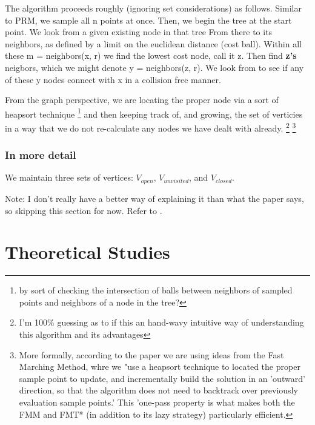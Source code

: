 \documentclass[a4paper]{article}
\begin{document}
The algorithm proceeds roughly (ignoring set considerations) as follows. 
Similar to PRM, we sample all n points at once. Then, we begin the tree at the start
point. We look from a given existing node in that tree From there to its
neighbors, as defined by a limit on the euclidean distance (cost ball). Within
all these m = neighbors(x, r) we find the lowest cost node, call it z. Then find \textbf{z's}
neigbors, which we might denote y = neighbors(z, r). We look from to see if any
of these y nodes connect with x in a collision free manner.

From the graph perspective, we are locating the proper node via a sort of
heapsort technique \footnote{by sort of checking the intersection of balls
between neighbors of sampled points and neighbors of a node in the tree?} and
then keeping track of, and growing, the set of verticies in a way that we do not
re-calculate any nodes we have dealt with already. \footnote{I'm 100\% guessing
as to if this an hand-wavy intuitive way of understanding this algorithm and its
advantages} \footnote{More formally, according to the paper \cite{FMT*} we are using ideas
from the Fast Marching Method, whre we "use a heapsort technique to located the
proper sample point to update, and incrementally build the solution in an
'outward' direction, so that the algorithm does not need to backtrack over
previously evaluation sample points.' This 'one-pass property is what makes both
the FMM and FMT* (in addition to its lazy strategy) particularly efficient.}

\subsubsection{In more detail}

We maintain three sets of vertices: $V_{open}$, $V_{unvisited}$, and $V_{closed}$.

Note: I don't really have a better way of explaining it than what the paper
says, so skipping this section for now. Refer to \cite{FMT*}.


\section{Theoretical Studies}
\end{document}
